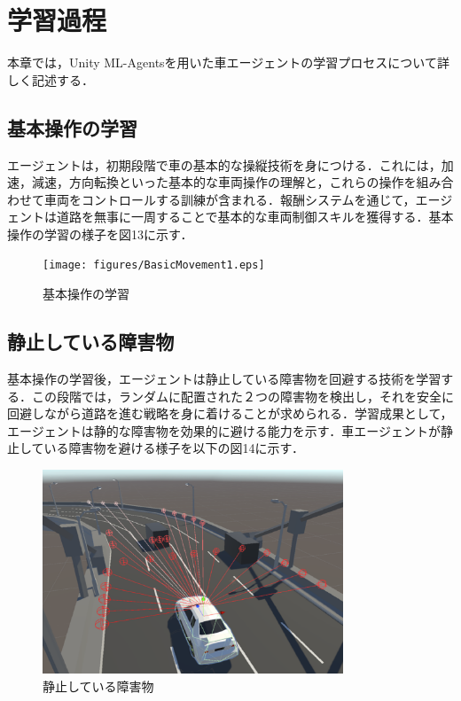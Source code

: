 \section{学習過程}
本章では，Unity ML-Agentsを用いた車エージェントの学習プロセスについて詳しく記述する．
\subsection{基本操作の学習}
エージェントは，初期段階で車の基本的な操縦技術を身につける．これには，加速，減速，方向転換といった基本的な車両操作の理解と，これらの操作を組み合わせて車両をコントロールする訓練が含まれる．報酬システムを通じて，エージェントは道路を無事に一周することで基本的な車両制御スキルを獲得する．基本操作の学習の様子を図13に示す．
\begin{figure}[H]
    \centering
    \texttt{[image: figures/BasicMovement1.eps]} %
    \caption{基本操作の学習} %
    \label{fig:basic-movement-2} %
\end{figure}

\subsection{静止している障害物}
基本操作の学習後，エージェントは静止している障害物を回避する技術を学習する．この段階では，ランダムに配置された２つの障害物を検出し，それを安全に回避しながら道路を進む戦略を身に着けることが求められる．学習成果として，エージェントは静的な障害物を効果的に避ける能力を示す．車エージェントが静止している障害物を避ける様子を以下の図14に示す．
\begin{figure}[H]
    \centering
    \includegraphics[width=0.8\textwidth]{figures/NonMovingObstacle.eps} %
    \caption{静止している障害物} %
    \label{fig:non-moving-obstacle} %
\end{figure}

